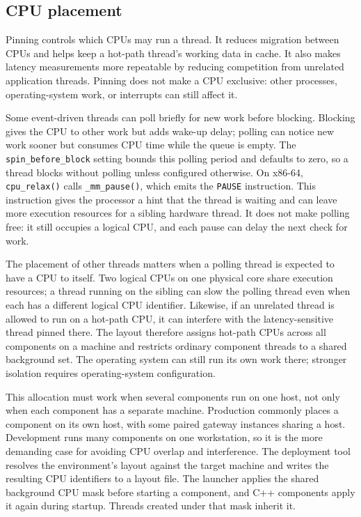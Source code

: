\subsection{CPU placement}

Pinning controls which CPUs may run a thread. It reduces migration between
CPUs and helps keep a hot-path thread's working data in cache. It also makes
latency measurements more repeatable by reducing competition from unrelated
application threads. Pinning does not make a CPU exclusive: other processes,
operating-system work, or interrupts can still affect it.

Some event-driven threads can poll briefly for new work before blocking.
Blocking gives the CPU to other work but adds wake-up delay; polling can notice
new work sooner but consumes CPU time while the queue is empty. The
\texttt{spin\_before\_block} setting bounds this polling period and defaults to
zero, so a thread blocks without polling unless configured otherwise. On
x86-64, \texttt{cpu\_relax()} calls \texttt{\_mm\_pause()}, which emits the
\texttt{PAUSE} instruction. This instruction gives the processor a hint that
the thread is waiting and can leave more execution resources for a sibling
hardware thread. It does not make polling free: it still occupies a logical
CPU, and each pause can delay the next check for work.

The placement of other threads matters when a polling thread is expected to
have a CPU to itself. Two logical CPUs on one physical core share execution
resources; a thread running on the sibling can slow the polling thread even
when each has a different logical CPU identifier. Likewise, if an unrelated
thread is allowed to run on a hot-path CPU, it can interfere with the
latency-sensitive thread pinned there. The layout therefore assigns hot-path
CPUs across all components on a machine and restricts ordinary component
threads to a shared background set. The operating system can still run its
own work there; stronger isolation requires operating-system configuration.

This allocation must work when several components run on one host, not only
when each component has a separate machine. Production commonly places a
component on its own host, with some paired gateway instances sharing a host.
Development runs many components on one workstation, so it is the more
demanding case for avoiding CPU overlap and interference. The deployment tool
resolves the environment's layout against the target machine and writes the
resulting CPU identifiers to a layout file. The launcher applies the shared
background CPU mask before starting a component, and C++ components apply it
again during startup. Threads created under that mask inherit it.

